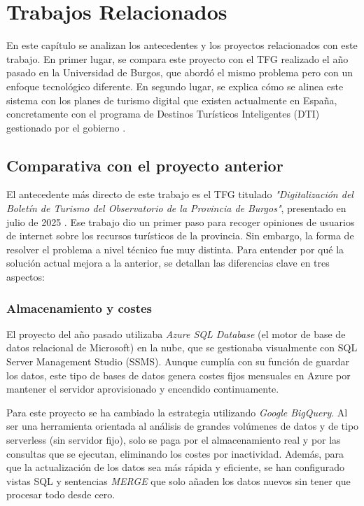 \chapter{Trabajos Relacionados}

En este capítulo se analizan los antecedentes y los proyectos relacionados con este trabajo. En primer lugar, se compara este proyecto con el TFG realizado el año pasado en la Universidad de Burgos, que abordó el mismo problema pero con un enfoque tecnológico diferente. En segundo lugar, se explica cómo se alinea este sistema con los planes de turismo digital que existen actualmente en España, concretamente con el programa de Destinos Turísticos Inteligentes (DTI) gestionado por el gobierno \cite{segitturdti}.

\section{Comparativa con el proyecto anterior}

El antecedente más directo de este trabajo es el TFG titulado \textit{"Digitalización del Boletín de Turismo del Observatorio de la Provincia de Burgos"}, presentado en julio de 2025 \cite{nunez2025}. Ese trabajo dio un primer paso para recoger opiniones de usuarios de internet sobre los recursos turísticos de la provincia. Sin embargo, la forma de resolver el problema a nivel técnico fue muy distinta. Para entender por qué la solución actual mejora a la anterior, se detallan las diferencias clave en tres aspectos:

\subsection{Almacenamiento y costes}
El proyecto del año pasado utilizaba \textit{Azure SQL Database} (el motor de base de datos relacional de Microsoft) en la nube, que se gestionaba visualmente con SQL Server Management Studio (SSMS). Aunque cumplía con su función de guardar los datos, este tipo de bases de datos genera costes fijos mensuales en Azure por mantener el servidor aprovisionado y encendido continuamente.

Para este proyecto se ha cambiado la estrategia utilizando \textit{Google BigQuery}. Al ser una herramienta orientada al análisis de grandes volúmenes de datos y de tipo serverless (sin servidor fijo), solo se paga por el almacenamiento real y por las consultas que se ejecutan, eliminando los costes por inactividad. Además, para que la actualización de los datos sea más rápida y eficiente, se han configurado vistas SQL y sentencias \textit{MERGE} que solo añaden los datos nuevos sin tener que procesar todo desde cero.


